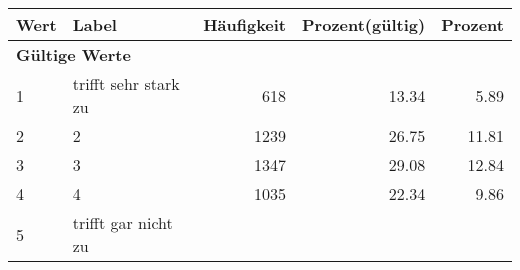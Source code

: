      \begin{longtable}{lXrrr}
     \toprule
     \textbf{Wert} & \textbf{Label} & \textbf{Häufigkeit} & \textbf{Prozent(gültig)} & \textbf{Prozent} \\
     \endhead
     \midrule
     \multicolumn{5}{l}{\textbf{Gültige Werte}}\\

     1 &
     \multicolumn{1}{X}{ trifft sehr stark zu   } &


       \num{618} &
       \num[round-mode=places,round-precision=2]{13,34} &
         \num[round-mode=places,round-precision=2]{5,89} \\

     2 &
     \multicolumn{1}{X}{ 2   } &


       \num{1239} &
       \num[round-mode=places,round-precision=2]{26,75} &
         \num[round-mode=places,round-precision=2]{11,81} \\

     3 &
     \multicolumn{1}{X}{ 3   } &


       \num{1347} &
       \num[round-mode=places,round-precision=2]{29,08} &
         \num[round-mode=places,round-precision=2]{12,84} \\

     4 &
     \multicolumn{1}{X}{ 4   } &


       \num{1035} &
       \num[round-mode=places,round-precision=2]{22,34} &
         \num[round-mode=places,round-precision=2]{9,86} \\

     5 &
     \multicolumn{1}{X}{ trifft gar nicht zu   } &



\end{longtable}
